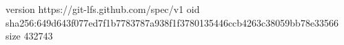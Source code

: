 version https://git-lfs.github.com/spec/v1
oid sha256:649d643f077ed7f1b7783787a938f1f3780135446ccb4263c38059bb78e33566
size 432743
